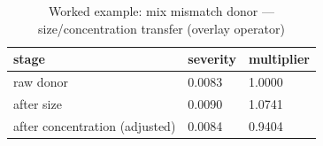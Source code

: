 \begin{table}[htbp]
\centering
\caption{Worked example: mix mismatch donor --- size/concentration transfer (overlay operator)}
\label{tab:v2_we_mix_mismatch}
\begin{tabular}{lll}
\toprule
\textbf{stage} & \textbf{severity} & \textbf{multiplier} \\
\midrule
raw donor & 0.0083 & 1.0000 \\
after size & 0.0090 & 1.0741 \\
after concentration (adjusted) & 0.0084 & 0.9404 \\
\bottomrule
\end{tabular}
\end{table}
